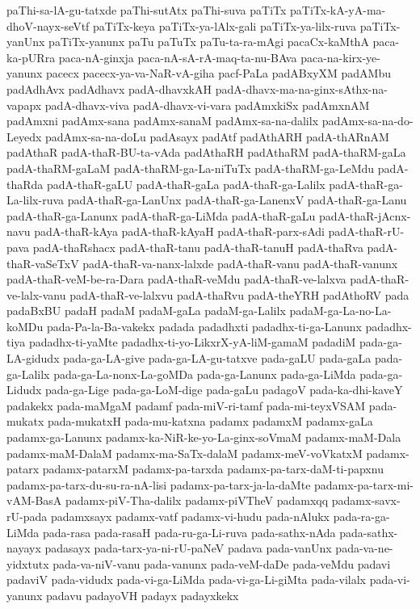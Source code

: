 {paThi-sa-lA-gu-tatxde
paThi-sutAtx
paThi-suva
paTiTx
paTiTx-kA-yA-ma-dhoV-nayx-seVtf
paTiTx-keya
paTiTx-ya-lAlx-gali
paTiTx-ya-lilx-ruva
paTiTx-yanUnx
paTiTx-yanunx
paTu
paTuTx
paTu-ta-ra-mAgi
pacaCx-kaMthA
paca-ka-pURra
paca-nA-ginxja
paca-nA-sA-rA-maq-ta-nu-BAva
paca-na-kirx-ye-yanunx
pacecx
pacecx-ya-va-NaR-vA-giha
pacf-PaLa
padABxyXM
padAMbu
padAdhAvx
padAdhavx
padA-dhavxkAH
padA-dhavx-ma-na-ginx-sAthx-na-vapapx
padA-dhavx-viva
padA-dhavx-vi-vara
padAmxkiSx
padAmxnAM
padAmxni
padAmx-sana
padAmx-sanaM
padAmx-sa-na-dalilx
padAmx-sa-na-do-Leyedx
padAmx-sa-na-doLu
padAsayx
padAtf
padAthARH
padA-thARnAM
padAthaR
padA-thaR-BU-ta-vAda
padAthaRH
padAthaRM
padA-thaRM-gaLa
padA-thaRM-gaLaM
padA-thaRM-ga-La-niTuTx
padA-thaRM-ga-LeMdu
padA-thaRda
padA-thaR-gaLU
padA-thaR-gaLa
padA-thaR-ga-Lalilx
padA-thaR-ga-La-lilx-ruva
padA-thaR-ga-LanUnx
padA-thaR-ga-LanenxV
padA-thaR-ga-Lanu
padA-thaR-ga-Lanunx
padA-thaR-ga-LiMda
padA-thaR-gaLu
padA-thaR-jAcnx-navu
padA-thaR-kAya
padA-thaR-kAyaH
padA-thaR-parx-sAdi
padA-thaR-rU-pava
padA-thaRshacx
padA-thaR-tanu
padA-thaR-tanuH
padA-thaRva
padA-thaR-vaSeTxV
padA-thaR-va-nanx-lalxde
padA-thaR-vanu
padA-thaR-vanunx
padA-thaR-veM-be-ra-Dara
padA-thaR-veMdu
padA-thaR-ve-lalxva
padA-thaR-ve-lalx-vanu
padA-thaR-ve-lalxvu
padA-thaRvu
padA-theYRH
padAthoRV
pada
padaBxBU
padaH
padaM
padaM-gaLa
padaM-ga-Lalilx
padaM-ga-La-no-La-koMDu
pada-Pa-la-Ba-vakekx
padada
padadhxti
padadhx-ti-ga-Lanunx
padadhx-tiya
padadhx-ti-yaMte
padadhx-ti-yo-LikxrX-yA-liM-gamaM
padadiM
pada-ga-LA-gidudx
pada-ga-LA-give
pada-ga-LA-gu-tatxve
pada-gaLU
pada-gaLa
pada-ga-Lalilx
pada-ga-La-nonx-La-goMDa
pada-ga-Lanunx
pada-ga-LiMda
pada-ga-Lidudx
pada-ga-Lige
pada-ga-LoM-dige
pada-gaLu
padagoV
pada-ka-dhi-kaveY
padakekx
pada-maMgaM
padamf
pada-miV-ri-tamf
pada-mi-teyxVSAM
pada-mukatx
pada-mukatxH
pada-mu-katxna
padamx
padamxM
padamx-gaLa
padamx-ga-Lanunx
padamx-ka-NiR-ke-yo-La-ginx-soVmaM
padamx-maM-Dala
padamx-maM-DalaM
padamx-ma-SaTx-dalaM
padamx-meV-voVkatxM
padamx-patarx
padamx-patarxM
padamx-pa-tarxda
padamx-pa-tarx-daM-ti-papxnu
padamx-pa-tarx-du-su-ra-nA-lisi
padamx-pa-tarx-ja-la-daMte
padamx-pa-tarx-mi-vAM-BasA
padamx-piV-Tha-dalilx
padamx-piVTheV
padamxqq
padamx-savx-rU-pada
padamxsayx
padamx-vatf
padamx-vi-hudu
pada-nAlukx
pada-ra-ga-LiMda
pada-rasa
pada-rasaH
pada-ru-ga-Li-ruva
pada-sathx-nAda
pada-sathx-nayayx
padasayx
pada-tarx-ya-ni-rU-paNeV
padava
pada-vanUnx
pada-va-ne-yidxtutx
pada-va-niV-vanu
pada-vanunx
pada-veM-daDe
pada-veMdu
padavi
padaviV
pada-vidudx
pada-vi-ga-LiMda
pada-vi-ga-Li-giMta
pada-vilalx
pada-vi-yanunx
padavu
padayoVH
padayx
padayxkekx
}

